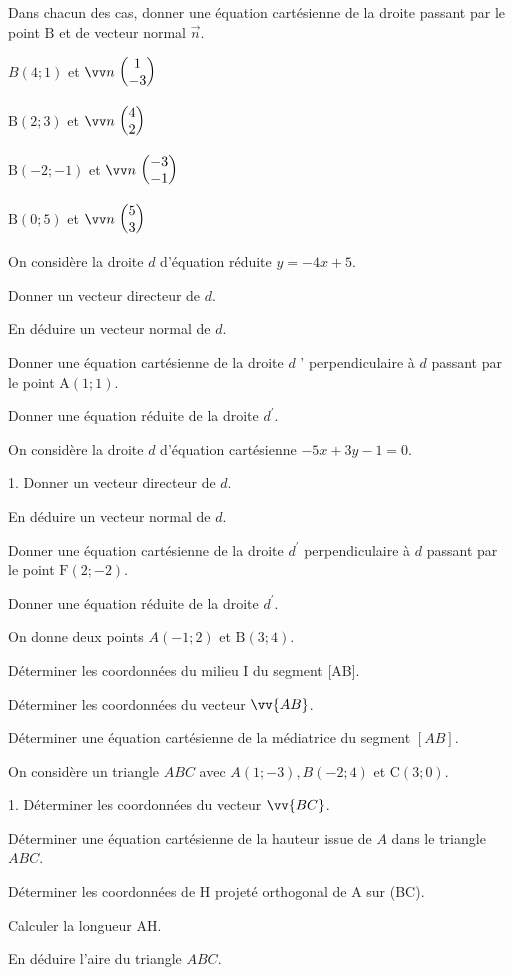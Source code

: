 \documentclass[11pt,a4paper]{article}  %
\begin{document}
\exerciceDS{}

Dans chacun des cas, donner une équation cartésienne de la droite passant par le point $\mathrm{B}$ et de vecteur normal $\vec{n}$.
\begin{enumMet}
	\item $B(4 ; 1)$ et $\Coord{n}{1}{-3}$
	\item $\mathrm{B}(2 ; 3)$ et $\Coord{n}{4}{2}$
	\item $\mathrm{B}(-2 ;-1)$ et $\Coord{n}{-3}{-1}$
	\item $\mathrm{B}(0 ; 5)$ et $\Coord{n}{5}{3}$
\end{enumMet}

\exerciceDS{}
On considère la droite $d$ d'équation réduite $y=-4 x+5$.
\begin{enumMet}
	\item Donner un vecteur directeur de $d$.
	\item En déduire un vecteur normal de $d$.
	\item Donner une équation cartésienne de la droite $d$ ' perpendiculaire à $d$ passant par le point $\mathrm{A}(1 ; 1)$.
	\item Donner une équation réduite de la droite $d^{\prime}$.
\end{enumMet}

\exerciceDS{}
On considère la droite $d$ d'équation cartésienne $-5 x+3 y-1=0$.
\begin{enumMet}
	\item 1. Donner un vecteur directeur de $d$.
	\item En déduire un vecteur normal de $d$.
	\item Donner une équation cartésienne de la droite $d^{\prime}$ perpendiculaire à $d$ passant par le point $\mathrm{F}(2 ;-2)$.
	\item Donner une équation réduite de la droite $d^{\prime}$.
\end{enumMet}


\exerciceDS{} %
On donne deux points $A(-1 ; 2)$ et $\mathrm{B}(3 ; 4)$.
\begin{enumMet}
	\item Déterminer les coordonnées du milieu I du segment [AB].
	\item Déterminer les coordonnées du vecteur $\vv{A B}$.
	\item Déterminer une équation cartésienne de la médiatrice du segment $[A B]$.
\end{enumMet}


\exerciceDS{} %
On considère un triangle $A B C$ avec $A(1 ;-3), B(-2 ; 4)$ et $\mathrm{C}(3 ; 0)$.
\begin{enumMet}
	\item 1. Déterminer les coordonnées du vecteur $\vv{B C}$.
	\item Déterminer une équation cartésienne de la hauteur issue de $A$ dans le triangle $A B C$.
	\item Déterminer les coordonnées de $\mathrm{H}$ projeté orthogonal de A sur (BC).
	\item Calculer la longueur $\mathrm{AH}$.
	\item En déduire l'aire du triangle $A B C$.
\end{enumMet}
\end{document}
